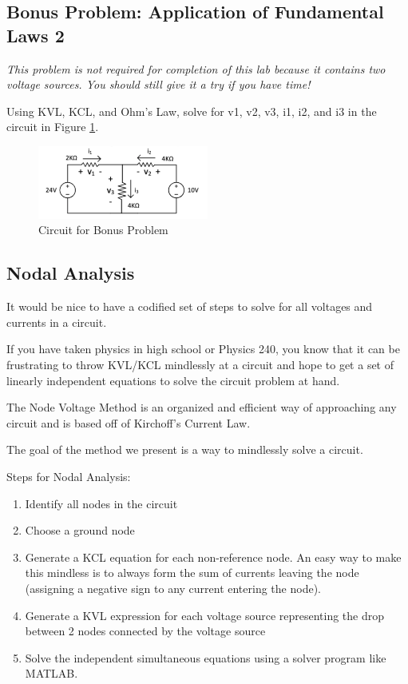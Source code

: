 \documentclass{article}
\begin{document}
\subsection{Bonus Problem: Application of Fundamental Laws 2}

\textit{This problem is not required for completion of this lab because it
  contains two voltage sources. You should still give it a try if you have
time!}

Using KVL, KCL, and Ohm's Law, solve for v1, v2, v3, i1, i2, and i3 in the
circuit in Figure \ref{fig:bonus_assignment}.

\begin{figure}[!htbp]
\centering
\includegraphics[width=0.5\textwidth]{hw2_1}
\caption{Circuit for Bonus Problem}
\label{fig:bonus_assignment}
\end{figure}


\subsection{Nodal Analysis}

It would be nice to have a codified set of steps to solve for all voltages and currents in a circuit.

If you have taken physics in high school or Physics 240, you know that it can be frustrating to throw KVL/KCL mindlessly at a circuit and hope to get a set of linearly independent equations to solve the circuit problem at hand.

The Node Voltage Method is an organized and efficient way of approaching any circuit and is based off of Kirchoff's Current Law.

The goal of the method we present is a way to mindlessly solve a circuit.

Steps for Nodal Analysis:

\begin{enumerate}
  \item Identify all nodes in the circuit
  \item Choose a ground node
  \item Generate a KCL equation for each non-reference node. An easy way to make this mindless is to always form the sum of currents leaving the node (assigning a negative sign to any current entering the node).
  \item Generate a KVL expression for each voltage source representing the drop between 2 nodes connected by the voltage source
  \item Solve the independent simultaneous equations using a solver program like MATLAB.
\end{enumerate}
\end{document}
